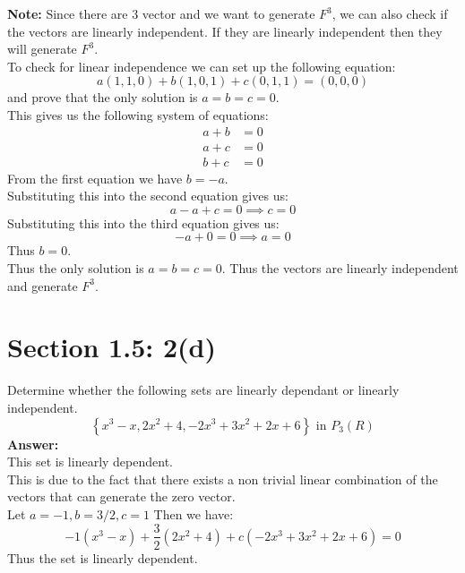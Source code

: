 \documentclass{article}
\begin{document}
\textbf{Note:}
Since there are 3 vector and we want to generate $F^3$, we can also check if the vectors are linearly independent. If they are linearly independent then they will generate $F^3$.\\
To check for linear independence we can set up the following equation:
$$ a(1,1,0) + b(1,0,1) + c(0,1,1) = (0,0,0)$$
and prove that the only solution is $a = b = c = 0$.\\
This gives us the following system of equations:
\begin{align*}
    a + b &= 0 \\
    a + c &= 0 \\
    b + c &= 0
\end{align*}
From the first equation we have $b = -a$.\\
Substituting this into the second equation gives us:
$$ a - a + c = 0 \implies c = 0$$
Substituting this into the third equation gives us:
$$ -a + 0 = 0 \implies a = 0$$
Thus $b = 0$.\\
Thus the only solution is $a = b = c = 0$. Thus the vectors are linearly independent and generate $F^3$.\\





\section*{Section 1.5: 2(d)}
Determine whether the following sets are linearly dependant or linearly independent.
$$ \left\{x^3 - x, 2x^2 + 4, -2x^3 + 3x^2 + 2x+ 6   \right\} \text{ in } P_3(R)$$
\textbf{Answer:} \\
This set is linearly dependent.\\
This is due to the fact that there exists a non trivial linear combination of the vectors that can generate the zero vector.\\
Let $a = -1, b = 3/2, c = 1$ Then we have:
$$ -1(x^3 - x) + \frac{3}{2}(2x^2 + 4) + c(-2x^3 + 3x^2 + 2x + 6) = 0$$
Thus the set is linearly dependent.\\
\end{document}
